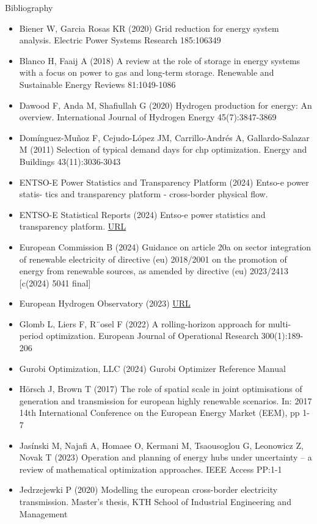 \documentclass[pdf]{beamer}
\begin{document}
  \begin{frame}{Bibliography}
    \tiny
    \begin{itemize}
      \item Biener W, Garcia Rosas KR (2020) Grid reduction for energy system analysis. Electric
      Power Systems Research 185:106349
      \item Blanco H, Faaij A (2018) A review at the role of storage in energy systems with a
      focus on power to gas and long-term storage. Renewable and Sustainable Energy
      Reviews 81:1049-1086
      \item Dawood F, Anda M, Shafiullah G (2020) Hydrogen production for energy: An overview.
      International Journal of Hydrogen Energy 45(7):3847-3869
      \item Dom\'{i}nguez-Mu\~{n}oz F, Cejudo-L\'{o}pez JM, Carrillo-Andr\'{e}s A, Gallardo-Salazar M (2011)
      Selection of typical demand days for chp optimization. Energy and Buildings
      43(11):3036-3043
      \item ENTSO-E Power Statistics and Transparency Platform (2024) Entso-e power statis-
      tics and transparency platform - cross-border physical flow.
      \item ENTSO-E Statistical Reports (2024) Entso-e power statistics and transparency platform.
       \href{https://www.entsoe.eu/data/power-stats/}{URL}
      \item European Commission B (2024) Guidance on article 20a on sector integration of renewable
      electricity of directive (eu) 2018/2001 on the promotion of energy from renewable
      sources, as amended by directive (eu) 2023/2413 [c(2024) 5041 final]
      \item European Hydrogen Observatory (2023) \href{https://observatory.clean-hydrogen.europa.eu/tools-reports/levelised-cost-hydrogen-calculator}{URL}
      \item Glomb L, Liers F, R¨osel F (2022) A rolling-horizon approach for multi-period optimization.
      European Journal of Operational Research 300(1):189-206
      \item Gurobi Optimization, LLC (2024) Gurobi Optimizer Reference Manual
      \item H\"{o}rsch J, Brown T (2017) The role of spatial scale in joint optimisations of generation
      and transmission for european highly renewable scenarios. In: 2017 14th International
      Conference on the European Energy Market (EEM), pp 1-7
      \item Jas\'{i}nski M, Najafi A, Homaee O, Kermani M, Tsaousoglou G, Leonowicz Z, Novak T (2023)
      Operation and planning of energy hubs under uncertainty -- a review of mathematical
      optimization approaches. IEEE Access PP:1-1
      \item Jedrzejewki P (2020) Modelling the european cross-border electricity transmission. Master’s
      thesis, KTH School of Industrial Engineering and Management
    \end{itemize}
  \end{frame}
\end{document}

